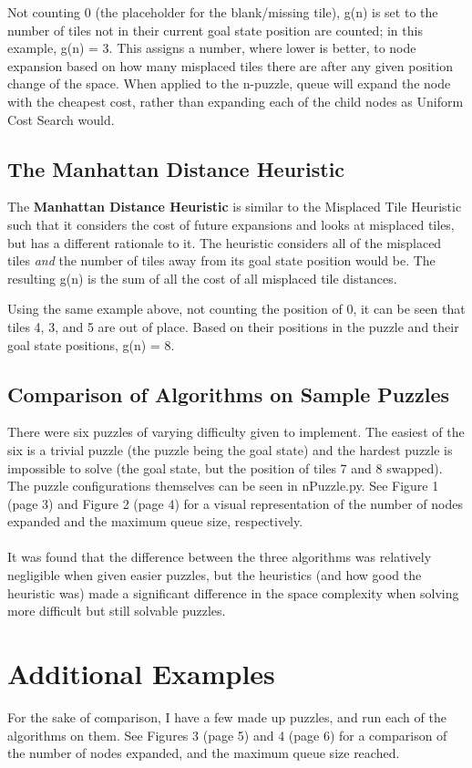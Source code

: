 \documentclass[a4paper]{article}
\begin{document}
Not counting 0 (the placeholder for the blank/missing tile), g(n) is set to the
 number of tiles not in their current goal state position are counted; in this
 example, g(n) = 3. This assigns a number, where lower is better, to node
 expansion based on how many misplaced tiles there are after any given position
 change of the space. When applied to the n-puzzle, queue will expand the node
 with the cheapest cost, rather than expanding each of the child nodes as
 Uniform Cost Search would.

 \subsection{The Manhattan Distance Heuristic}
 The \textbf{Manhattan Distance Heuristic} is similar to the Misplaced Tile
 Heuristic such that it considers the cost of future expansions and looks at
 misplaced tiles, but has a different rationale to it. The heuristic considers
 all of the misplaced tiles \textit{and} the number of tiles away from its goal
 state position would be. The resulting g(n) is the sum of all the cost of all
 misplaced tile distances.

 Using the same example above, not counting the position of 0, it can be seen
 that tiles 4, 3, and 5 are out of place. Based on their positions in the puzzle
 and their goal state positions, g(n) = 8.
 
\subsection{Comparison of Algorithms on Sample Puzzles}
There were six puzzles of varying difficulty given to implement. The easiest
of the six is a trivial puzzle (the puzzle being the goal state) and the hardest puzzle
is impossible to solve (the goal state, but the position of tiles 7 and 8
swapped). The puzzle configurations themselves can be seen in nPuzzle.py.
See Figure 1 (page 3) and Figure 2 (page 4) for a visual representation of the number of nodes
expanded and the maximum queue size, respectively. \\ \\ It was found that the
difference between the three algorithms was relatively negligible when given
easier puzzles, but the heuristics (and how good the heuristic was) made a
significant difference in the space complexity when solving more difficult but
still solvable puzzles.

\section{Additional Examples}
For the sake of comparison, I have a few made up puzzles, and run each of the
algorithms on them. See Figures 3 (page 5) and 4 (page 6) for a comparison of the number of nodes
expanded, and the maximum queue size reached.
\end{document}
